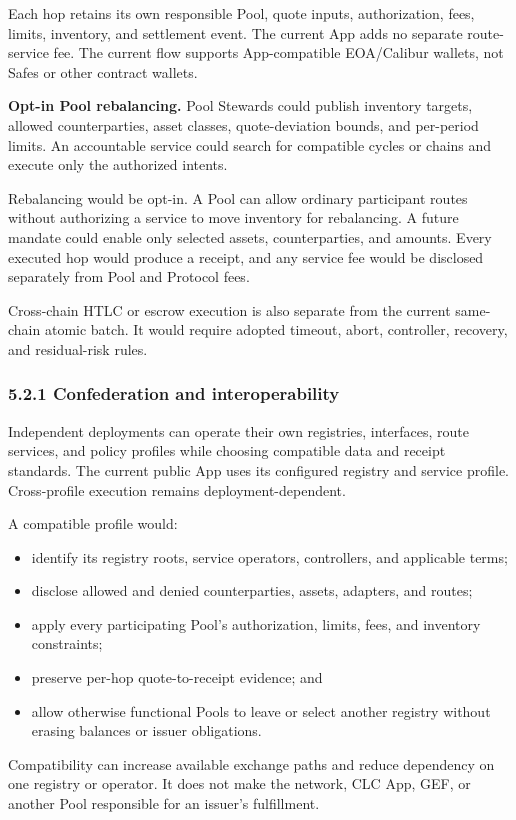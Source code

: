 \documentclass[11pt]{article}
\begin{document}
Each hop retains its own responsible Pool, quote inputs, authorization, fees, limits, inventory, and settlement event. The current App adds no separate route-service fee. The current flow supports App-compatible EOA/Calibur wallets, not Safes or other contract wallets.

\textbf{Opt-in Pool rebalancing.} Pool Stewards could publish inventory targets, allowed counterparties, asset classes, quote-deviation bounds, and per-period limits. An accountable service could search for compatible cycles or chains and execute only the authorized intents.

Rebalancing would be opt-in. A Pool can allow ordinary participant routes without authorizing a service to move inventory for rebalancing. A future mandate could enable only selected assets, counterparties, and amounts. Every executed hop would produce a receipt, and any service fee would be disclosed separately from Pool and Protocol fees.

Cross-chain HTLC or escrow execution is also separate from the current same-chain atomic batch. It would require adopted timeout, abort, controller, recovery, and residual-risk rules.

\subsubsection*{5.2.1 Confederation and interoperability}

Independent deployments can operate their own registries, interfaces, route services, and policy profiles while choosing compatible data and receipt standards. The current public App uses its configured registry and service profile. Cross-profile execution remains deployment-dependent.

A compatible profile would:

\begin{itemize}[leftmargin=*]
\item identify its registry roots, service operators, controllers, and applicable terms;
\item disclose allowed and denied counterparties, assets, adapters, and routes;
\item apply every participating Pool's authorization, limits, fees, and inventory constraints;
\item preserve per-hop quote-to-receipt evidence; and
\item allow otherwise functional Pools to leave or select another registry without erasing balances or issuer obligations.
\end{itemize}
Compatibility can increase available exchange paths and reduce dependency on one registry or operator. It does not make the network, CLC App, GEF, or another Pool responsible for an issuer's fulfillment.
\end{document}
